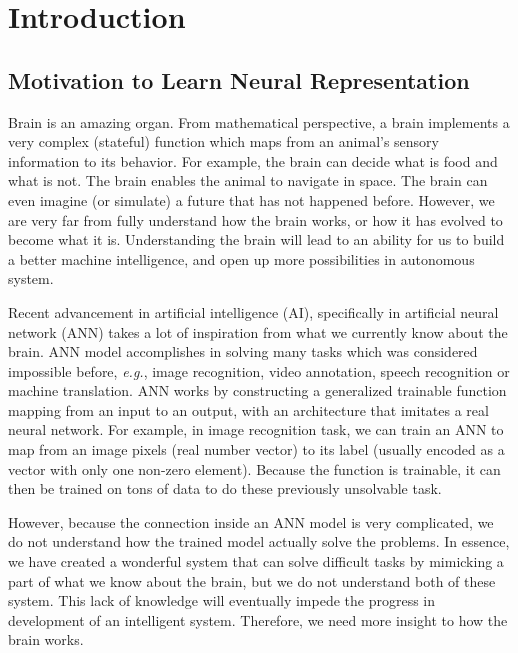 \chapter{Introduction}

\section{Motivation to Learn Neural Representation}

Brain is an amazing organ. From mathematical perspective, a brain implements a very complex (stateful) function which maps from an animal's sensory information to its behavior. For example, the brain can decide what is food and what is not. The brain enables the animal to navigate in space. The brain can even imagine (or simulate) a future that has not happened before. However, we are very far from fully understand how the brain works, or how it has evolved to become what it is. Understanding the brain will lead to an ability for us to build a better machine intelligence, and open up more possibilities in autonomous system.

Recent advancement in artificial intelligence (AI), specifically in artificial neural network (ANN) takes a lot of inspiration from what we currently know about the brain. ANN model accomplishes in solving many tasks which was considered impossible before, \textit{e.g.}, image recognition, video annotation, speech recognition or machine translation. ANN works by constructing a generalized trainable function mapping from an input to an output, with an architecture that imitates a real neural network. For example, in image recognition task, we can train an ANN to map from an image pixels (real number vector) to its label (usually encoded as a vector with only one non-zero element). Because the function is trainable, it can then be trained on tons of data to do these previously unsolvable task.

However, because the connection inside an ANN model is very complicated, we do not understand how the trained model actually solve the problems. In essence, we have created a wonderful system that can solve difficult tasks by mimicking a part of what we know about the brain, but we do not understand both of these system. This lack of knowledge will eventually impede the progress in development of an intelligent system. Therefore, we need more insight to how the brain works. 

